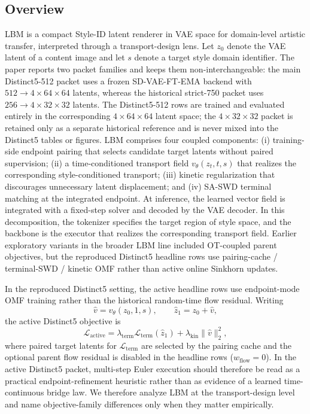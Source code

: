 \documentclass[letterpaper]{article}
\begin{document}
\subsection{Overview}
LBM is a compact Style-ID latent renderer in VAE space for domain-level artistic transfer, interpreted through a transport-design lens. Let $z_0$ denote the VAE latent of a content image and let $s$ denote a target style domain identifier. The paper reports two packet families and keeps them non-interchangeable: the main Distinct5-512 packet uses a frozen SD-VAE-FT-EMA backend with $512\!\rightarrow\!4\times64\times64$ latents, whereas the historical strict-750 packet uses $256\!\rightarrow\!4\times32\times32$ latents. The Distinct5-512 rows are trained and evaluated entirely in the corresponding $4\times64\times64$ latent space; the $4\times32\times32$ packet is retained only as a separate historical reference and is never mixed into the Distinct5 tables or figures. LBM comprises four coupled components: (i) training-side endpoint pairing that selects candidate target latents without paired supervision; (ii) a time-conditioned transport field $v_\theta(z_t,t,s)$ that realizes the corresponding style-conditioned transport; (iii) kinetic regularization that discourages unnecessary latent displacement; and (iv) SA-SWD terminal matching at the integrated endpoint. At inference, the learned vector field is integrated with a fixed-step solver and decoded by the VAE decoder. In this decomposition, the tokenizer specifies the target region of style space, and the backbone is the executor that realizes the corresponding transport field. Earlier exploratory variants in the broader LBM line included OT-coupled parent objectives, but the reproduced Distinct5 headline rows use pairing-cache / terminal-SWD / kinetic OMF rather than active online Sinkhorn updates.

In the reproduced Distinct5 setting, the active headline rows use endpoint-mode OMF training rather than the historical random-time flow residual. Writing
\begin{equation}
    \hat v = v_\theta(z_0,1,s), \qquad \hat z_1 = z_0 + \hat v,
\end{equation}
the active Distinct5 objective is
\begin{equation}
    \mathcal{L}_{\mathrm{active}} = \lambda_{\mathrm{term}}\mathcal{L}_{\mathrm{term}}(\hat z_1) + \lambda_{\mathrm{kin}}\|\hat v\|_2^2,
    \label{eq:active_distinct5_loss}
\end{equation}
where paired target latents for $\mathcal{L}_{\mathrm{term}}$ are selected by the pairing cache and the optional parent flow residual is disabled in the headline rows ($w_{\mathrm{flow}}=0$). In the active Distinct5 packet, multi-step Euler execution should therefore be read as a practical endpoint-refinement heuristic rather than as evidence of a learned time-continuous bridge law. We therefore analyze LBM at the transport-design level and name objective-family differences only when they matter empirically.
\end{document}
